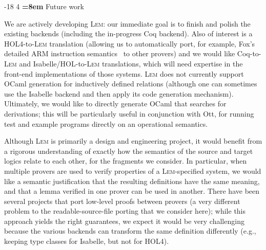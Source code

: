 \documentclass[a4paper]{llncs}
\makeatletter
\renewcommand{\section}{\vspace*{-2mm}\@startsection{section}{1}{\z@}%
                       {-18\p@ \@plus -4\p@ \@minus -4\p@}%
                       {4\p@ \@plus 2\p@ \@minus 2\p@}%
                       {\normalfont\large\bfseries\boldmath
                        \rightskip=\z@ \@plus 8em\pretolerance=10000 }}
\newcommand{\toolname}{\textsc{Lem}}
\makeatother
\begin{document}


\section{Future work}

We are actively developing \toolname{}: our immediate goal is to
finish and polish the existing backends (including the in-progress Coq backend).
Also of
interest is a HOL4-to-\toolname{} translation (allowing us to
automatically port, for example, Fox's detailed ARM instruction semantics~\cite{anthonyARM}
to other provers) and we 
would like Coq-to-\toolname{} and Isabelle/HOL-to-\toolname{}
translations,
which will need expertise in the front-end implementations of those
systems. 
%
\toolname{} does not currently support OCaml generation for
inductively defined relations (although one can sometimes use the Isabelle backend and then
apply its code generation mechanism).  Ultimately, we would like to directly generate
OCaml that searches for derivations; this will be particularly useful in conjunction with Ott, for
running test and example programs directly on an operational semantics.

Although \toolname{} is primarily a design and engineering project, it
would benefit from a rigorous understanding of exactly how the semantics
of the source and target logics relate to each other, for the
fragments we consider.  In particular, when
multiple provers are used to verify properties of a \toolname{}-specified system,
we would like a semantic justification that the resulting definitions have the
same meaning, and that a lemma verified in one prover can be used in another.
%
There have been several projects that port low-level proofs between
provers (a very different problem to the readable-source-file porting
that we consider here); while
this approach yields the right guarantees, we expect it would be
very challenging because the various backends can transform the same definition
differently (e.g., keeping type classes for Isabelle, but not for HOL4).




\vspace*{-3mm}



%
{

}
\end{document}
